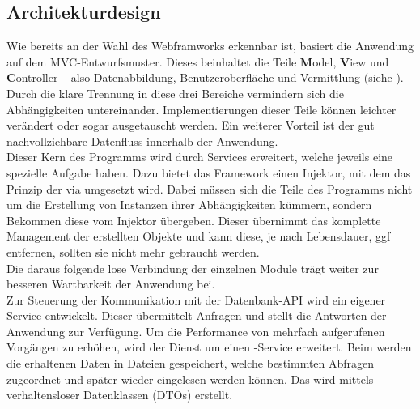 \subsection{Architekturdesign}
\label{sec:Architekturdesign}
Wie bereits an der Wahl des Webframworks erkennbar ist, basiert die Anwendung auf dem \acs{MVC}-Entwurfsmuster.
Dieses beinhaltet die Teile \textbf{M}odel, \textbf{V}iew und \textbf{C}ontroller -- also Datenabbildung, 
Benutzeroberfläche und Vermittlung (siehe ). Durch die klare Trennung in diese drei Bereiche vermindern sich
die Abhängigkeiten untereinander. Implementierungen dieser Teile können leichter verändert oder sogar ausgetauscht werden.
Ein weiterer Vorteil ist der gut nachvollziehbare Datenfluss innerhalb der Anwendung.\\
Dieser Kern des Programms wird durch Services erweitert, welche jeweils eine spezielle Aufgabe haben.
Dazu bietet das Framework einen Injektor, mit dem das Prinzip der  via 
 umgesetzt wird. Dabei müssen sich die Teile des Programms nicht um die Erstellung von
Instanzen ihrer Abhängigkeiten kümmern, sondern Bekommen diese vom Injektor übergeben. Dieser übernimmt
das komplette Management der erstellten Objekte und kann diese, je nach Lebensdauer, \acs{ggf} entfernen, sollten sie nicht mehr 
gebraucht werden. \\

Die daraus folgende lose Verbindung der einzelnen Module trägt weiter zur besseren Wartbarkeit der Anwendung bei.\\
Zur Steuerung der Kommunikation mit der Datenbank-API wird ein eigener Service entwickelt. Dieser übermittelt
Anfragen und stellt die Antworten der Anwendung zur Verfügung. Um die Performance von
mehrfach aufgerufenen Vorgängen zu erhöhen, wird der Dienst um einen -Service erweitert.
Beim  werden die erhaltenen Daten in Dateien gespeichert, welche bestimmten Abfragen
zugeordnet und später wieder eingelesen werden können.
Das  wird mittels verhaltensloser Datenklassen (\acs{DTO}s) erstellt. 

